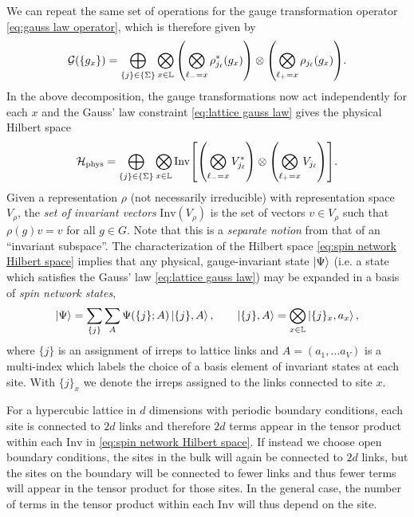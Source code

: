 We can repeat the same set of operations for the gauge transformation operator \eqref{eq:gauss law operator}, which is therefore given by
\begin{equation}
    \mathcal{G}(\{g_x\}) =
    \bigoplus_{\{j\} \in \{\Sigma\}} \bigotimes_{x \in \Lattice} \pqty{\bigotimes_{\link_{-}=x} \rho_{j_{\link}}^*(g_x)} \otimes \pqty{\bigotimes_{\link_{+}=x} \rho_{j_{\link}}(g_x) }.
\end{equation}
In the above decomposition, the gauge transformations now act independently for each $x$ and the Gauss' law constraint \eqref{eq:lattice gauss law} gives the physical Hilbert space
\begin{equation}
    \label{eq:spin network Hilbert space}
    \HilbertPhys = \bigoplus_{\{j\} \in \{\Sigma\}} \bigotimes_{x \in \Lattice} \mathrm{Inv}\bqty{\pqty{\bigotimes_{\link_{-}=x} V_{j_{\link}}^*} \otimes \pqty{\bigotimes_{\link_{+}=x} V_{j_{\link}} }}.
\end{equation}
Given a representation $\rho$ (not necessarily irreducible) with representation space $V_\rho$, the \emph{set of invariant vectors} $\mathrm{Inv}(V_\rho)$ is the set of vectors $v \in V_\rho$ such that $\rho(g) v = v$ for all $g\in G$.
Note that this is a \emph{separate notion} from that of an ``invariant subspace''.
The characterization of the Hilbert space \eqref{eq:spin network Hilbert space} implies that any physical, gauge-invariant state $\ket{\Psi}$ (i.e.
a state which satisfies the Gauss' law \eqref{eq:lattice gauss law}) may be expanded in a basis of \emph{spin network states},
\begin{equation}
    \ket{\Psi} = \sum_{ \{j\} } \sum_{ A } \Psi(\{j\}; A) \ket{\{j\},A}, \qquad \ket{\{j\},A} = \bigotimes_{x \in \mathbb{L}} \ket{\{j\}_x,a_x},
\end{equation}
where $\{j\}$ is an assignment of irreps to lattice links and $A=(a_1, \ldots a_V)$ is a multi-index which labels the choice of a basis element of invariant states at each site.
With $\{j\}_x$ we denote the irreps assigned to the links connected to site $x$.

For a hypercubic lattice in $d$ dimensions with periodic boundary conditions, each site is connected to $2d$ links and therefore $2d$ terms appear in the tensor product within each $\mathrm{Inv}$ in \eqref{eq:spin network Hilbert space}.
If instead we choose open boundary conditions, the sites in the bulk will again be connected to $2d$ links, but the sites on the boundary will be connected to fewer links and thus fewer terms will appear in the tensor product for those sites.
In the general case, the number of terms in the tensor product within each $\mathrm{Inv}$ will thus depend on the site.

